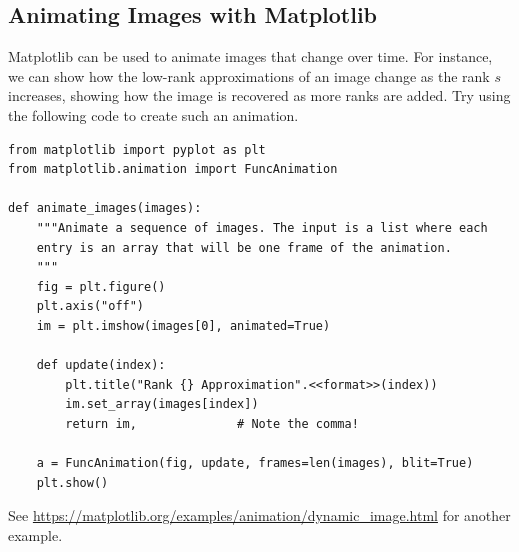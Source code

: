 \subsection*{Animating Images with Matplotlib} %

Matplotlib can be used to animate images that change over time.
For instance, we can show how the low-rank approximations of an image change as the rank $s$ increases, showing how the image is recovered as more ranks are added.
Try using the following code to create such an animation.

\begin{lstlisting}
from matplotlib import pyplot as plt
from matplotlib.animation import FuncAnimation

def animate_images(images):
    """Animate a sequence of images. The input is a list where each
    entry is an array that will be one frame of the animation.
    """
    fig = plt.figure()
    plt.axis("off")
    im = plt.imshow(images[0], animated=True)

    def update(index):
        plt.title("Rank {} Approximation".<<format>>(index))
        im.set_array(images[index])
        return im,              # Note the comma!

    a = FuncAnimation(fig, update, frames=len(images), blit=True)
    plt.show()
\end{lstlisting}
See \url{https://matplotlib.org/examples/animation/dynamic_image.html} for another example.
